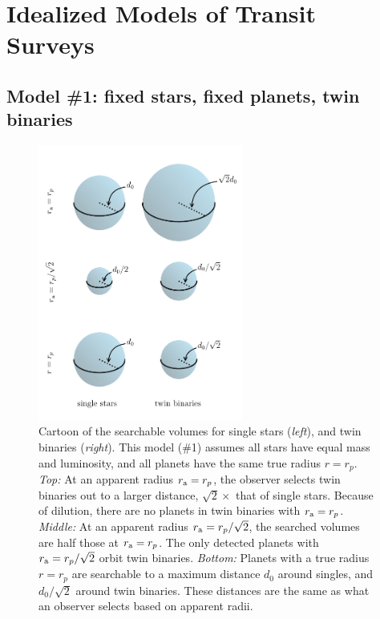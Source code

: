 \documentclass[12pt,modern]{aastex61}
\renewcommand{\a}{_{\rm a}}
\begin{document}
%

\section{Idealized Models of Transit Surveys}

\subsection{Model \#1: fixed stars, fixed planets, twin binaries}
\label{sec:model_1}

\begin{figure}[!tb]
    \begin{center}
        \includegraphics[width=0.6\textwidth]{figures/visualize_volumes.pdf}
    \end{center}
    \caption{
        Cartoon of the searchable volumes for single stars ({\it left}), and 
        twin binaries ({\it right}).
        This model (\#1) assumes all stars have equal mass and luminosity, and 
        all planets have the same true radius $r=r_p$.
        {\it Top:} At an apparent radius $r\a=r_p$,
        the observer selects twin binaries out to a larger         
        distance, $\sqrt{2}\times$ that of single stars.
        Because of dilution, there are no planets in twin binaries with 
        $r\a=r_p$.
        {\it Middle:} At an apparent radius $r\a=r_p/\sqrt{2}$, the 
        searched volumes are half those at $r\a=r_p$. 
        The only detected planets with $r\a=r_p/\sqrt{2}$ orbit twin binaries.
        {\it Bottom:} Planets with a true radius $r=r_p$ are searchable to 
        a maximum distance $d_0$ around singles, and $d_0/\sqrt{2}$ around 
        twin binaries. These distances are the same as what an observer 
        selects based on apparent radii.
    }
    \label{fig:model_1_volumes}
\end{figure}
\end{document}
